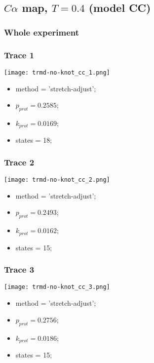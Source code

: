 \begin{minipage}[c]{0.45\textwidth}
\subsection{$C\alpha$ map, $T=0.4$ (model CC)}
\subsubsection{Whole experiment}

\subsubsection{Trace 1}
\begin{minipage}[c]{0.7\textwidth}
    \texttt{[image: trmd-no-knot\_cc\_1.png]}
\end{minipage}
\hfill
\begin{minipage}[c]{0.45\textwidth}
    \begin{itemize}
        \item method = 'stretch-adjust';
        \item $p_{prot}=0.2585$;
        \item $k_{prot}=0.0169$;
        \item states = 18;
    \end{itemize}
\end{minipage}

\subsubsection{Trace 2}
\begin{minipage}[c]{0.7\textwidth}
    \texttt{[image: trmd-no-knot\_cc\_2.png]}
\end{minipage}
\hfill
\begin{minipage}[c]{0.45\textwidth}
    \begin{itemize}
        \item method = 'stretch-adjust';
        \item $p_{prot}=0.2493$;
        \item $k_{prot}=0.0162$;
        \item states = 15;
    \end{itemize}
\end{minipage}

\subsubsection{Trace 3}
\begin{minipage}[c]{0.7\textwidth}
    \texttt{[image: trmd-no-knot\_cc\_3.png]}
\end{minipage}
\hfill
\begin{minipage}[c]{0.45\textwidth}
    \begin{itemize}
        \item method = 'stretch-adjust';
        \item $p_{prot}=0.2756$;
        \item $k_{prot}=0.0186$;
        \item states = 15;
    \end{itemize}
\end{minipage}


\end{minipage}
